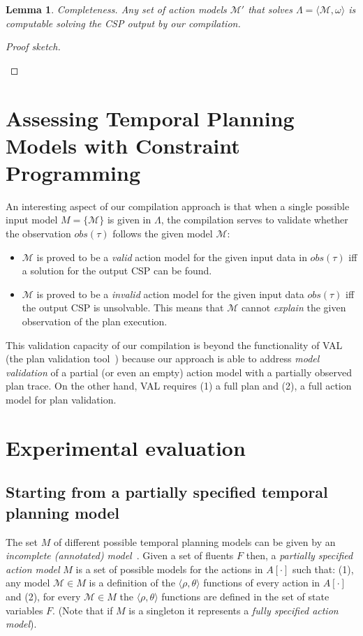 \documentclass[letterpaper]{article} %
\newcommand{\tup}[1]{{\langle #1 \rangle}}
\newtheorem{lemma}[theorem]{Lemma}
\begin{document}
\begin{lemma}
Completeness. Any set of action models $\mathcal{M}'$ that solves $\Lambda=\tup{\mathcal{M},\omega}$ is computable solving the CSP output by our compilation.
\end{lemma}

\begin{proof}[Proof sketch]
\begin{small}
\end{small}
\end{proof}



\section{Assessing Temporal Planning Models with Constraint Programming}
An interesting aspect of our compilation approach is that when a single possible input model $M=\{\mathcal{M}\}$ is given in $\Lambda$, the compilation serves to validate whether the observation $obs(\tau)$ follows the given model $\mathcal{M}$:

\begin{itemize}
	\item $\mathcal{M}$ is proved to be a {\em valid} action model for the given input data in $obs(\tau)$ iff a solution for the output CSP can be found.
	\item $\mathcal{M}$ is proved to be a {\em invalid} action model for the given input data $obs(\tau)$ iff the output CSP is unsolvable. This means that $\mathcal{M}$ cannot {\em explain} the given observation of the plan execution.
\end{itemize}

This validation capacity of our compilation is beyond the functionality of VAL (the plan validation tool~\cite{howey2004val}) because our approach is able to address {\em model validation} of a partial (or even an empty) action model with a partially observed plan trace. On the other hand, VAL requires (1) a full plan and (2), a full action model for plan validation.

\section{Experimental evaluation}
\label{sec:evaluation}

\subsection{Starting from a partially specified temporal planning model}
The set $M$ of different possible temporal planning models can be given by an {\em incomplete (annotated) model}~\cite{sreedharan2018handling}. Given a set of fluents $F$ then, a {\em partially specified action model} $M$ is a set of possible models for the actions in $A[\cdot]$ such that: (1), any model $\mathcal{M}\in M$ is a definition of the $\tup{\rho,\theta}$ functions of every action in $A[\cdot]$ and (2), for every $\mathcal{M}\in M$ the $\tup{\rho,\theta}$ functions are defined in the set of state variables $F$. (Note that if $M$ is a singleton it represents a {\em fully specified action model}).
\end{document}
